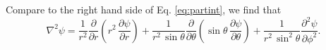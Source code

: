 \documentclass[11pt]{article}
\begin{document}
Compare to the right hand side of Eq. \eqref{eq:partint},
we find that
\begin{equation}
  \nabla^2\psi
=
  \frac{1}{r^2}
  \frac{\partial}{\partial r}
  \left(
    r^2 \,
    \frac{\partial \psi}{\partial r}
  \right)
  +
  \frac{1}{r^2 \, \sin\theta}
  \frac{\partial}{\partial \theta}
  \left(
    \sin\theta \,
    \frac{\partial \psi}{\partial \theta}
  \right)
  +
  \frac{1}{r^2 \, \sin^2\theta}
  \frac{\partial^2 \psi}{\partial \phi^2}.
  \label{eq:spcoords_laplacian}
\end{equation}





\end{document}
